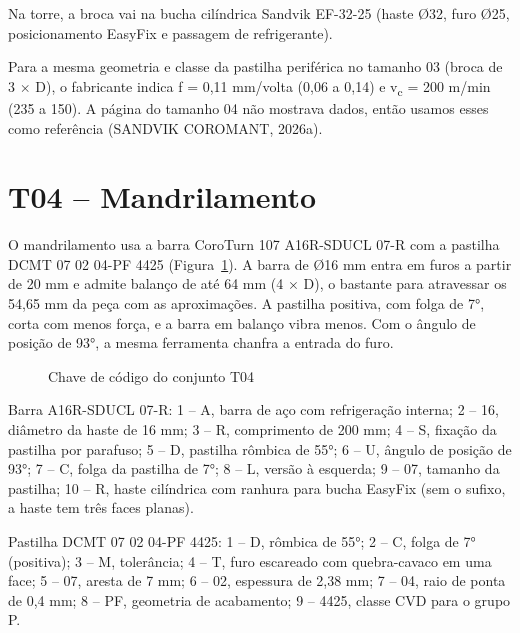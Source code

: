 \noindent Na torre, a broca vai na bucha cilíndrica Sandvik EF-32-25 (haste Ø32, furo Ø25, posicionamento EasyFix e passagem de refrigerante).

Para a mesma geometria e classe da pastilha periférica no tamanho 03 (broca de 3 $\times$ D), o fabricante indica f = 0,11 mm/volta (0,06 a 0,14) e v\textsubscript{c} = 200 m/min (235 a 150). A página do tamanho 04 não mostrava dados, então usamos esses como referência (SANDVIK COROMANT, 2026a).

\section{T04 – Mandrilamento}

O mandrilamento usa a barra CoroTurn 107 A16R-SDUCL 07-R com a pastilha DCMT 07 02 04-PF 4425 (Figura~\ref{fig:chaveT04}). A barra de Ø16 mm entra em furos a partir de 20 mm e admite balanço de até 64 mm (4 $\times$ D), o bastante para atravessar os 54,65 mm da peça com as aproximações. A pastilha positiva, com folga de 7°, corta com menos força, e a barra em balanço vibra menos. Com o ângulo de posição de 93°, a mesma ferramenta chanfra a entrada do furo.

\begin{figure}[H]
\centering
\caption{Chave de código do conjunto T04}\label{fig:chaveT04}
\par\medskip
{}
\end{figure}

\noindent Barra A16R-SDUCL 07-R: 1 – A, barra de aço com refrigeração interna; 2 – 16, diâmetro da haste de 16 mm; 3 – R, comprimento de 200 mm; 4 – S, fixação da pastilha por parafuso; 5 – D, pastilha rômbica de 55°; 6 – U, ângulo de posição de 93°; 7 – C, folga da pastilha de 7°; 8 – L, versão à esquerda; 9 – 07, tamanho da pastilha; 10 – R, haste cilíndrica com ranhura para bucha EasyFix (sem o sufixo, a haste tem três faces planas).

\noindent Pastilha DCMT 07 02 04-PF 4425: 1 – D, rômbica de 55°; 2 – C, folga de 7° (positiva); 3 – M, tolerância; 4 – T, furo escareado com quebra-cavaco em uma face; 5 – 07, aresta de 7 mm; 6 – 02, espessura de 2,38 mm; 7 – 04, raio de ponta de 0,4 mm; 8 – PF, geometria de acabamento; 9 – 4425, classe CVD para o grupo P.

